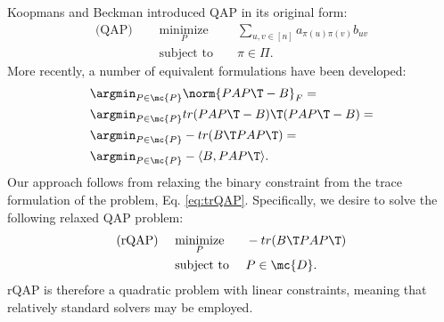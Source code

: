 \documentclass[10pt,journal,cspaper,compsoc]{IEEEtran}
\newcommand{\PmcP}{P \in \mc{P}}
\begin{document}
Koopmans and Beckman \cite{Koopmans1957} introduced QAP in its original form:
\begin{subequations}
\begin{align}
	\text{(QAP) } \quad &\underset{P}{\text{minimize}}  &&\sum_{u,v \in [n]} a_{\pi(u)\pi(v)} b_{uv}  \\
	&\text{subject to } && \pi \in \Pi.
\end{align}
\end{subequations}
More recently, a number of equivalent formulations have been developed:
\begin{subequations} \label{eq:QAP}
\begin{align}
	&\argmin_{\PmcP} \norm{PAP\T - B}_F = \\
	&\argmin_{\PmcP} tr(PAP\T - B)\T (PAP\T - B)  = \\
	&\argmin_{\PmcP} - tr(B\T PAP\T)= \label{eq:trQAP}\\ %
	&\argmin_{\PmcP}  -\langle B,PAP\T \rangle.
\end{align}
\end{subequations}
Our approach follows from relaxing the binary constraint from the trace formulation of the problem, Eq. \eqref{eq:trQAP}.  Specifically, we desire to solve the following relaxed QAP problem:
\begin{subequations} \label{eq:rQAP}
\begin{align}
		\text{(rQAP) } \quad &\underset{P}{\text{minimize}}  && - tr(B\T PAP\T)  \\
		&\text{subject to } && P \in \mc{D}.
\end{align}
\end{subequations}
rQAP is therefore a quadratic problem with linear constraints, meaning that relatively standard solvers may be employed.
\end{document}
